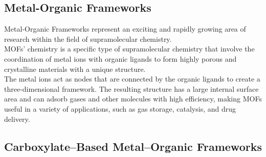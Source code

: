 \documentclass[../Master.tex]{subfiles}
\begin{document}
\subsection{Metal-Organic Frameworks}

Metal-Organic Frameworks represent an exciting and rapidly growing area of research within the field of supramolecular chemistry.\\
MOFs' chemistry is a specific type of supramolecular chemistry that involve the coordination of metal ions with organic ligands to form highly porous and crystalline materials with a unique structure. \\
The metal ions act as nodes that are connected by the organic ligands to create a three-dimensional framework. The resulting structure has a large internal surface area and can adsorb gases and other molecules with high efficiency, making MOFs useful in a variety of applications, such as gas storage, catalysis, and drug delivery.

\subsection{Carboxylate–Based Metal–Organic Frameworks}
\end{document}
